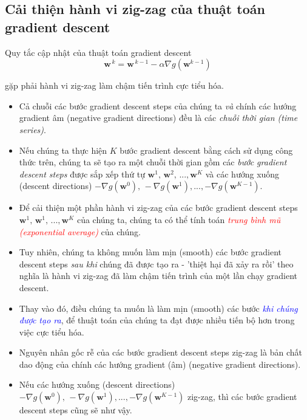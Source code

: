 \documentclass{book}
\begin{document}
\subsection{Cải thiện hành vi zig-zag của thuật toán gradient descent}
Quy tắc cập nhật của thuật toán gradient descent
    \begin{equation*}
    \mathbf{w}^{\,k} = \mathbf{w}^{\,k-1} - \alpha \nabla g\left(\mathbf{w}^{k-1}\right)
    \end{equation*}

gặp phải hành vi zig-zag làm chậm tiến trình cực tiểu hóa.
\begin{itemize}
    \item Cả chuỗi các bước gradient descent steps của chúng ta \textit{và} chính các hướng gradient âm (negative gradient directions) đều là các \textit{chuỗi thời gian (time series)}.
    \item Nếu chúng ta thực hiện $K$ bước gradient descent bằng cách sử dụng công thức trên, chúng ta sẽ tạo ra một chuỗi thời gian gồm các \textit{bước gradient descent steps} được sắp xếp thứ tự $\mathbf{w}^1,\,\mathbf{w}^{2},\,...,\mathbf{w}^{K}$ và các hướng xuống (descent directions) $-\nabla g\left(\mathbf{w}^{0}\right),\,-\nabla g\left(\mathbf{w}^{1}\right),...,-\nabla g\left(\mathbf{w}^{K-1}\right)$.
    \item Để cải thiện một phần hành vi zig-zag của các bước gradient descent steps $\mathbf{w}^1,\,\mathbf{w}^{1},\,...,\mathbf{w}^{K}$ của chúng ta, chúng ta có thể tính toán \textit{\textcolor{red}{trung bình mũ (exponential average)}} của chúng.
    \item Tuy nhiên, chúng ta không muốn làm mịn (smooth) các bước gradient descent steps \textit{sau khi} chúng đã được tạo ra - 'thiệt hại đã xảy ra rồi' theo nghĩa là hành vi zig-zag đã làm chậm tiến trình của một lần chạy gradient descent.
    \item Thay vào đó, điều chúng ta muốn là làm mịn (smooth) các bước \textit{\textcolor{blue}{khi chúng được tạo ra}}, để thuật toán của chúng ta đạt được nhiều tiến bộ hơn trong việc cực tiểu hóa.
    \item Nguyên nhân gốc rễ của các bước gradient descent steps zig-zag là bản chất dao động của chính các hướng gradient (âm) (negative gradient directions).
    \item Nếu các hướng xuống (descent directions) $-\nabla g\left(\mathbf{w}^{0}\right),\,-\nabla g\left(\mathbf{w}^{1}\right),...,-\nabla g\left(\mathbf{w}^{K-1}\right)$ zig-zag, thì các bước gradient descent steps cũng sẽ như vậy.

\end{itemize}
\end{document}
